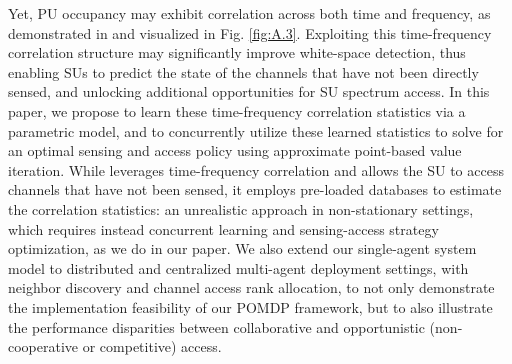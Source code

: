 \documentclass[10pt, twocolumn]{IEEEtran}
\begin{document}
Yet, PU occupancy may exhibit  correlation across both time and frequency, as demonstrated in \cite{WCL:12} and visualized in Fig. \ref{fig:A.3}. Exploiting this time-frequency correlation structure may significantly improve white-space detection, thus enabling SUs to predict the state of the channels that have not been directly sensed, and unlocking additional opportunities for SU spectrum access.
In this paper, we propose to learn these time-frequency correlation statistics via a parametric model, and to concurrently utilize these learned statistics to solve for an optimal sensing and access policy using approximate point-based value iteration. While \cite{WCL:7} leverages time-frequency correlation and allows the SU to access channels that have not been sensed, it employs pre-loaded databases to estimate the correlation statistics: an unrealistic approach in non-stationary settings, which requires instead concurrent learning and sensing-access strategy optimization, as we do in our paper. We also extend our single-agent system model to distributed and centralized multi-agent deployment settings, with neighbor discovery and channel access rank allocation, to not only demonstrate the implementation feasibility of our POMDP framework, but to also illustrate the performance disparities between collaborative and opportunistic (non-cooperative or competitive) access.
\end{document}
